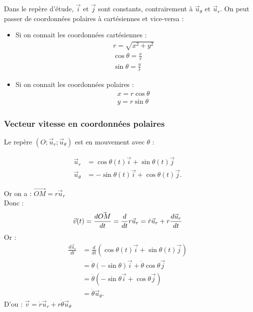 \documentclass{article}
\begin{document}
Dans le repère d'étude, $\vec{i} \text{ et } \vec{j}$ sont constants, contrairement à $\vec{u}_\theta \text{ et } \vec{u}_r$.
On peut passer de coordonnées polaires à cartésiennes et vice-versa :\\
\begin{itemize}
    \item Si on connait les coordonnées cartésiennes : \\ 
    \begin{eqnarray*}
        r = \sqrt{x^2 + y^2}\\ \cos\theta = \frac{x}{r}\\ \sin\theta = \frac{y}{r} 
    \end{eqnarray*}
    \item Si on connait les coordonnées polaires : \\
    \begin{eqnarray*}
        x = r \cos\theta\\
        y = r \sin\theta
    \end{eqnarray*}
\end{itemize}
    
\subsubsection{Vecteur vitesse en coordonnées polaires}

Le repère $(O;\vec{u}_r;\vec{u}_\theta)$ est en mouvement avec $\theta$ : 

\begin{align*}
    \vec{u}_r &= \cos\theta(t) \vec{i} + \sin\theta(t)\vec{j}\\
    \vec{u}_\theta &=  -\sin\theta(t)\vec{i} + \cos\theta(t)\vec{j} 
.\end{align*}

Or on a : 
$\vec{OM} = r\vec{u}_r$\\
Donc : 
\begin{equation*}
    \vec{v}(t) = \frac{d\vec{OM}}{dt} = \frac{d}{dt}\space r \space \vec{u}_r = \dot{r} \vec{u}_r + r \frac{d\vec{u}_r}{dt} 
\end{equation*}
Or : 
\begin{align*}
    \frac{d\vec{u}_r}{dt} &= \frac{d}{dt} (\cos\theta(t) \vec{i} + \sin\theta(t)\vec{j})\\
    &= \dot{\theta} (-\sin\theta) \vec{i} + \dot{\theta} \cos\theta \vec{j}\\
    &= \dot{\theta} (-\sin\theta \vec{i} + \cos\theta \vec{j})\\
    &= \dot{\theta}\vec{u}_\theta
.\end{align*}
D'ou  : $\vec{v} = \dot{r}\vec{u}_r + r\dot{\theta}\vec{u}_\theta$
\end{document}
